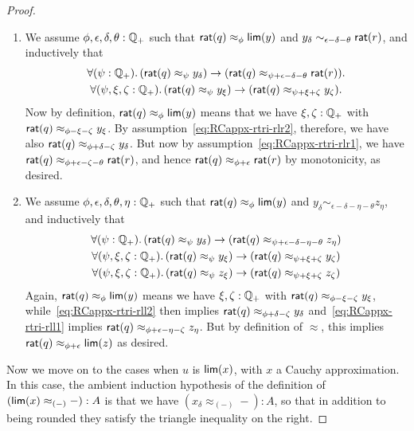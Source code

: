 \begin{proof}
\begin{enumerate}
  \item We assume $\phi,\epsilon,\delta,\theta:\mathbb{Q}_{+}$ such that $\mathsf{rat}(q)\approx_\phi \mathsf{lim}(y)$ and $y_\delta \sim_{\epsilon-\delta-\theta} \mathsf{rat}(r)$, and inductively that
    \begin{gather}
      \fall{\psi:\Qp}(\rcrat(q) \approx_{\psi} y_\delta) \to (\rcrat(q) \approx_{\psi+\epsilon-\delta-\theta} \rcrat(r)).\label{eq:RCappx-rtri-rlr1}\\
      \fall{\psi,\xi,\zeta:\Qp} (\rcrat(q) \approx_{\psi} y_\xi) \to (\rcrat(q) \approx_{\psi+\xi+\zeta} y_\zeta).\label{eq:RCappx-rtri-rlr2}
    \end{gather}
    Now by definition, $\mathsf{rat}(q)\approx_\phi \mathsf{lim}(y)$ means that we have $\xi,\zeta:\mathbb{Q}_{+}$ with $\mathsf{rat}(q) \approx_{\phi-\xi-\zeta} y_\xi$.
    By assumption~\eqref{eq:RCappx-rtri-rlr2}, therefore, we have also $\mathsf{rat}(q) \approx_{\phi+\delta-\zeta} y_\delta$.
    But now by assumption~\eqref{eq:RCappx-rtri-rlr1}, we have $\mathsf{rat}(q) \approx_{\phi+\epsilon-\zeta-\theta} \mathsf{rat}(r)$, and hence $\mathsf{rat}(q) \approx_{\phi+\epsilon} \mathsf{rat}(r)$ by monotonicity, as desired.
  \item We assume $\phi,\epsilon,\delta,\theta,\eta:\mathbb{Q}_{+}$ such that $\mathsf{rat}(q)\approx_\phi \mathsf{lim}(y)$ and $y_\delta \sim_{\epsilon-\delta-\eta-\theta} z_\eta$, and inductively that 
    \begin{gather}
      \fall{\psi:\Qp}(\rcrat(q) \approx_{\psi} y_\delta) \to (\rcrat(q) \approx_{\psi+\epsilon-\delta-\eta-\theta} z_\eta)\label{eq:RCappx-rtri-rll1}\\
      \fall{\psi,\xi,\zeta:\Qp} (\rcrat(q) \approx_{\psi} y_\xi) \to (\rcrat(q) \approx_{\psi+\xi+\zeta} y_\zeta)\label{eq:RCappx-rtri-rll2}\\
      \fall{\psi,\xi,\zeta:\Qp} (\rcrat(q) \approx_{\psi} z_\xi) \to (\rcrat(q) \approx_{\psi+\xi+\zeta} z_\zeta)\label{eq:RCappx-rtri-rll3}
    \end{gather}
    Again, $\mathsf{rat}(q)\approx_\phi \mathsf{lim}(y)$ means we have $\xi,\zeta:\mathbb{Q}_{+}$ with $\mathsf{rat}(q) \approx_{\phi-\xi-\zeta} y_\xi$, while~\eqref{eq:RCappx-rtri-rll2} then implies $\mathsf{rat}(q) \approx_{\phi+\delta-\zeta} y_\delta$ and~\eqref{eq:RCappx-rtri-rll1} implies $\mathsf{rat}(q) \approx_{\phi+\epsilon-\eta-\zeta} z_\eta$.
    But by definition of $\approx$, this implies $\mathsf{rat}(q) \approx_{\phi+\epsilon} \mathsf{lim}(z)$ as desired.
  \end{enumerate}
  Now we move on to the cases when $u$ is $\mathsf{lim}(x)$, with $x$ a Cauchy approximation.
  In this case, the ambient induction hypothesis of the definition of $(\mathsf{lim}(x) \approx_{(-)} -) : A$ is that we have $(x_\delta \approx_{(-)} -): A$, so that in addition to being rounded they satisfy the triangle inequality on the right.

\end{proof}
